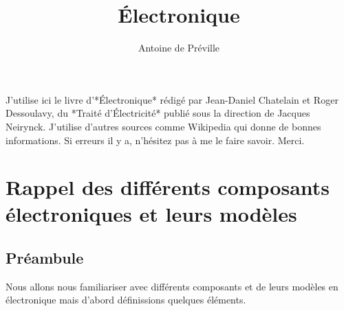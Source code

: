 \documentclass{article}
\title{Électronique}
\author{Antoine de Préville}
\begin{document}
\maketitle
\newpage
    J'utilise ici le livre d'*Électronique* rédigé par Jean-Daniel Chatelain et Roger Dessoulavy, du *Traité d'Électricité* publié sous la direction de Jacques Neirynck. J'utilise d'autres sources comme Wikipedia qui donne de bonnes informations. Si erreurs il y a, n'hésitez pas à me le faire savoir. Merci.

    \chapter{Rappel des différents composants électroniques et leurs modèles}

        \section{Préambule}
        Nous allons nous familiariser avec différents composants et de leurs modèles en électronique mais d'abord définissions quelques éléments.
\end{document}
